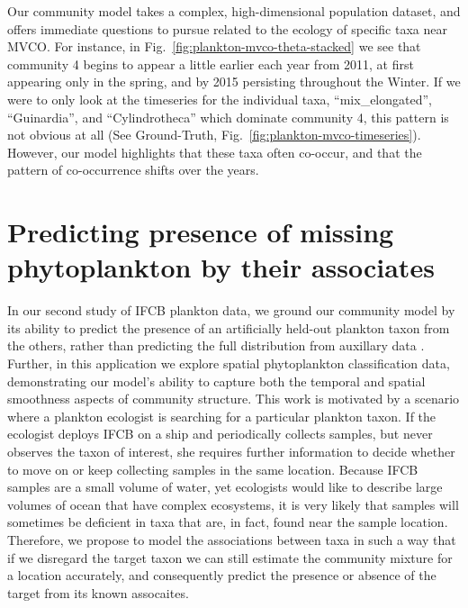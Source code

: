 Our community model takes a complex, high-dimensional population dataset, and offers immediate questions to pursue related to the ecology of specific taxa near MVCO. For instance, in Fig.~\ref{fig:plankton-mvco-theta-stacked} we see that community 4 begins to appear a little earlier each year from 2011, at first appearing only in the spring, and by 2015 persisting throughout the Winter. If we were to only look at the timeseries for the individual taxa, ``mix\_elongated'', ``Guinardia'', and ``Cylindrotheca'' which dominate community 4, this pattern is not obvious at all (See Ground-Truth, Fig.~\ref{fig:plankton-mvco-timeseries}). However, our model highlights that these taxa often co-occur, and that the pattern of co-occurrence shifts over the years.

\section{Predicting presence of missing phytoplankton by their associates} \label{sec:plankton-spatial-search}
In our second study of IFCB plankton data, we ground our community model by its ability to predict the presence of an artificially held-out plankton taxon from the others, rather than predicting the full distribution from auxillary data \citep{Kalmbach2017a}. Further, in this application we explore spatial phytoplankton classification data, demonstrating our model's ability to capture both the temporal and spatial smoothness aspects of community structure. This work is motivated by a scenario where a plankton ecologist is searching for a particular plankton taxon. If the ecologist deploys IFCB on a ship and periodically collects samples, but never observes the taxon of interest, she requires further information to decide whether to move on or keep collecting samples in the same location. Because IFCB samples are a small volume of water, yet ecologists would like to describe large volumes of ocean that have complex ecosystems, it is very likely that samples will sometimes be deficient in taxa that are, in fact, found near the sample location. Therefore, we propose to model the associations between taxa in such a way that if we disregard the target taxon we can still estimate the community mixture for a location accurately, and consequently predict the presence or absence of the target from its known assocaites.

